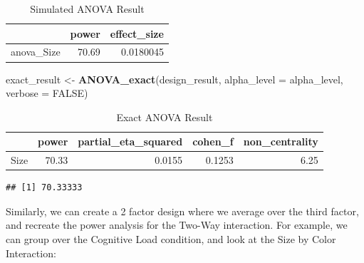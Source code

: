 \documentclass[]{book}
\newenvironment{Shaded}{\begin{snugshade}}{\end{snugshade}}
\newcommand{\CommentTok}[1]{\textcolor[rgb]{0.56,0.35,0.01}{\textit{#1}}}
\newcommand{\DataTypeTok}[1]{\textcolor[rgb]{0.13,0.29,0.53}{#1}}
\newcommand{\KeywordTok}[1]{\textcolor[rgb]{0.13,0.29,0.53}{\textbf{#1}}}
\newcommand{\NormalTok}[1]{#1}
\newcommand{\OperatorTok}[1]{\textcolor[rgb]{0.81,0.36,0.00}{\textbf{#1}}}
\newcommand{\OtherTok}[1]{\textcolor[rgb]{0.56,0.35,0.01}{#1}}
\newcommand{\StringTok}[1]{\textcolor[rgb]{0.31,0.60,0.02}{#1}}
\begin{document}
\begin{table}[!h]

\caption{\label{tab:unnamed-chunk-189}Simulated ANOVA Result}
\centering
\begin{tabular}{l|r|r}
\hline
  & power & effect\_size\\
\hline
anova\_Size & 70.69 & 0.0180045\\
\hline
\end{tabular}
\end{table}

\begin{Shaded}
\begin{Highlighting}[]
\NormalTok{exact_result <-}\StringTok{ }\KeywordTok{ANOVA_exact}\NormalTok{(design_result,}
                            \DataTypeTok{alpha_level =}\NormalTok{ alpha_level,}
                            \DataTypeTok{verbose =} \OtherTok{FALSE}\NormalTok{)}
\end{Highlighting}
\end{Shaded}

\begin{table}[!h]

\caption{\label{tab:unnamed-chunk-191}Exact ANOVA Result}
\centering
\begin{tabular}{l|r|r|r|r}
\hline
  & power & partial\_eta\_squared & cohen\_f & non\_centrality\\
\hline
Size & 70.33 & 0.0155 & 0.1253 & 6.25\\
\hline
\end{tabular}
\end{table}

\begin{Shaded}
\end{Shaded}

\begin{verbatim}
## [1] 70.33333
\end{verbatim}

Similarly, we can create a 2 factor design where we average over the third factor, and recreate the power analysis for the Two-Way interaction. For example, we can group over the Cognitive Load condition, and look at the Size by Color Interaction:
\end{document}
